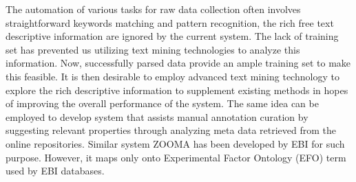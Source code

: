 %
% 



The automation of various tasks for raw data collection often involves
straightforward keywords matching and pattern recognition, the rich free text
descriptive information are ignored by the current system.
%
The lack of training set has prevented us utilizing text mining technologies to
analyze this information.
%
Now, successfully parsed data provide an ample training set to make this
feasible.
%
It is then desirable to employ advanced text mining technology to explore the
rich descriptive information to supplement existing methods in hopes of
improving the overall performance of the system.
%
The same idea can be employed to develop system that assists manual annotation
curation by suggesting relevant properties through analyzing meta data
retrieved from the online repositories.
%
Similar system ZOOMA \cite{ZOOMA} has been developed by EBI for such purpose.
However, it maps only onto Experimental Factor Ontology (EFO) term used by EBI
databases.
%







%



%
%
%
%



